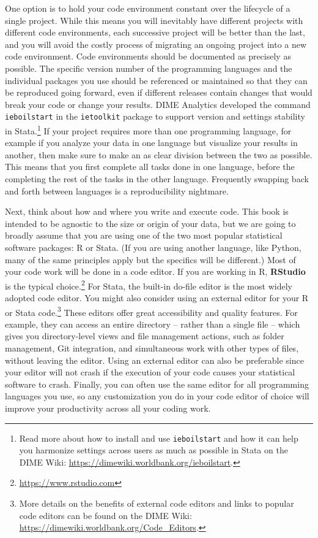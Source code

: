 \documentclass[
]{book}
\begin{document}
One option is to hold your code environment constant
over the lifecycle of a single project.
While this means you will inevitably have different projects
with different code environments, each successive project will be better than the last,
and you will avoid the costly process of migrating an ongoing project
into a new code environment.
Code environments should be documented as precisely as possible.
The specific version number of the programming languages and the individual packages you use
should be referenced or maintained so that they can be reproduced going forward,
even if different releases contain changes that would break your code
or change your results.
DIME Analytics developed the command \texttt{ieboilstart} in the \texttt{ietoolkit} package
to support version and settings stability in Stata.\footnote{Read more about how to install and use \texttt{ieboilstart}
  and how it can help you harmonize settings across users
  as much as possible in Stata on the DIME Wiki:
  \url{https://dimewiki.worldbank.org/ieboilstart}.}
If your project requires more than one programming language,
for example if you analyze your data in one language but visualize your results in another,
then make sure to make an as clear division between the two as possible.
This means that you first complete all tasks done in one language,
before the completing the rest of the tasks in the other language.
Frequently swapping back and forth between languages is a reproducibility nightmare.

Next, think about how and where you write and execute code.
This book is intended to be agnostic to the size or origin of your data,
but we are going to broadly assume that you are using
one of the two most popular statistical software packages: R or Stata.
(If you are using another language, like Python,
many of the same principles apply but the specifics will be different.)
Most of your code work will be done in a code editor.
If you are working in R, \textbf{RStudio} is the typical choice.\footnote{\url{https://www.rstudio.com}}
For Stata, the built-in do-file editor is the most widely adopted code editor.
You might also consider using an external editor for your R or Stata code.\footnote{More details on the benefits of external code editors and
  links to popular code editors can be found on the DIME Wiki:
  \url{https://dimewiki.worldbank.org/Code_Editors}.}
These editors offer great accessibility and quality features.
For example, they can access an entire directory -- rather than a single file --
which gives you directory-level views and file management actions,
such as folder management, Git integration,
and simultaneous work with other types of files, without leaving the editor.
Using an external editor can also be preferable since your editor will not crash
if the execution of your code causes your statistical software to crash.
Finally, you can often use the same editor for all programming languages you use,
so any customization you do in your code editor of choice
will improve your productivity across all your coding work.
\end{document}

